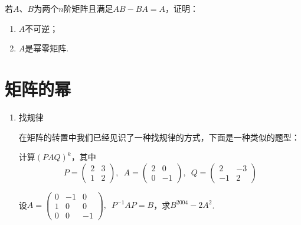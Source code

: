 \begin{example}
    若$A$、$B$为两个$n$阶矩阵且满足$AB-BA=A$，证明：
    \begin{enumerate}
        \item $A$不可逆；

        \item $A$是幂零矩阵.
    \end{enumerate}
\end{example}

\section{矩阵的幂}
\begin{enumerate}
    \item 找规律

    在矩阵的转置中我们已经见识了一种找规律的方式，下面是一种类似的题型：
    \begin{example}
        计算$(PAQ)^k$，其中
        \[P=\begin{pmatrix}2 & 3 \\ 1 & 2\end{pmatrix},\enspace A=\begin{pmatrix}2 & 0 \\ 0 & -1\end{pmatrix},\enspace Q=\begin{pmatrix}2 & -3 \\ -1 & 2\end{pmatrix}\]
    \end{example}

    \begin{example}
        设$A=\begin{pmatrix}0 & -1 & 0 \\ 1 & 0 & 0 \\ 0 & 0 & -1 \end{pmatrix},\enspace P^{-1}AP=B$，求$B^{2004}-2A^2$.
    \end{example}


\end{enumerate}
